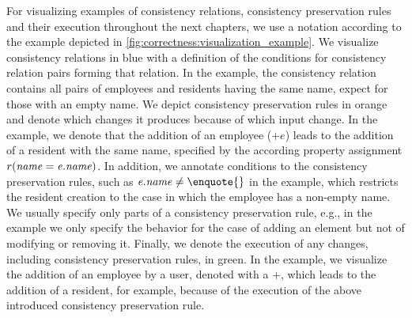 For visualizing examples of consistency relations, consistency preservation rules and their execution throughout the next chapters, we use a notation according to the example depicted in \autoref{fig:correctness:visualization_example}.
We visualize consistency relations in blue with a definition of the conditions for consistency relation pairs forming that relation.
In the example, the consistency relation contains all pairs of employees and residents having the same name, expect for those with an empty name.
We depict consistency preservation rules in orange and denote which changes it produces because of which input change.
In the example, we denote that the addition of an employee ($+e$) leads to the addition of a resident with the same name, specified by the according property assignment $r(\mathit{name} = \mathit{e.name})$.
In addition, we annotate conditions to the consistency preservation rules, such as $\mathvariable{e.name} \neq \textnormal{\enquote{}}$ in the example, which restricts the resident creation to the case in which the employee has a non-empty name.
We usually specify only parts of a consistency preservation rule, e.g., in the example we only specify the behavior for the case of adding an element but not of modifying or removing it.
Finally, we denote the execution of any changes, including consistency preservation rules, in green.
In the example, we visualize the addition of an employee by a user, denoted with a $+$, which leads to the addition of a resident, for example, because of the execution of the above introduced consistency preservation rule.



